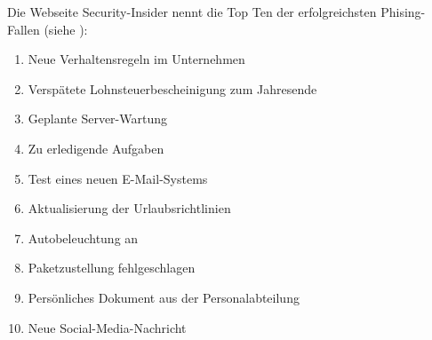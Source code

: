 \begin{frame}
Die Webseite Security-Insider nennt die Top Ten der erfolgreichsten Phising-Fallen (siehe \cite{SI}):
\begin{enumerate}
  \item Neue Verhaltensregeln im Unternehmen
  \item Verspätete Lohnsteuerbescheinigung zum Jahresende
  \item Geplante Server-Wartung
  \item Zu erledigende Aufgaben
  \item Test eines neuen E-Mail-Systems
  \item Aktualisierung der Urlaubsrichtlinien
  \item Autobeleuchtung an
  \item Paketzustellung fehlgeschlagen
  \item Persönliches Dokument aus der Personalabteilung
  \item Neue Social-Media-Nachricht
\end{enumerate}
\end{frame}